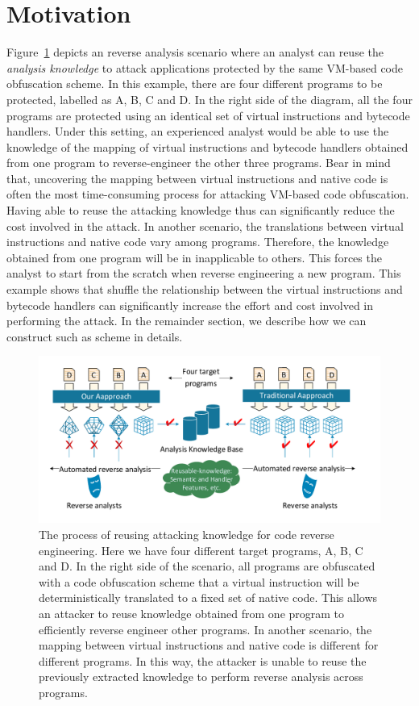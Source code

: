 \section{Motivation}
\label{sec:motivation}


Figure~\ref{fig:motivation} depicts an reverse analysis scenario where an analyst can
reuse the \textit{analysis knowledge} to attack applications protected by
the same VM-based code obfuscation scheme. In this example, there are four different programs
to be protected, labelled as A, B, C and D. In the right side of the diagram,
all the four programs are protected using an identical set of virtual
instructions and bytecode handlers. Under this setting, an experienced analyst would be able to
use the knowledge of the mapping of virtual instructions and bytecode handlers obtained
from one program to reverse-engineer the other three programs. Bear in mind that,
uncovering the mapping between virtual instructions and native code is often the most
time-consuming process for attacking VM-based code obfuscation. Having able to
reuse the attacking knowledge thus can significantly reduce the cost involved in the
attack.
In another scenario, the translations between virtual instructions and native code
vary among programs. Therefore, the knowledge obtained from one program will be in inapplicable to others.
This forces the analyst to start from the scratch when reverse engineering a new program.
This example shows that shuffle the relationship between the virtual instructions and bytecode handlers
can significantly increase the effort and cost involved in performing the attack.
In the remainder section, we describe how we can construct such as scheme in details.


\begin{figure}[!t]
\centering
\includegraphics[width=0.75\columnwidth]{fig/figmotivation.pdf}
\caption{The process of reusing attacking knowledge for code reverse engineering.
Here we have four different target programs, A, B, C and D.
In the right side of the scenario, all programs are obfuscated with a code obfuscation scheme that a virtual instruction will be deterministically translated to a fixed set of native code.
This allows an attacker to reuse knowledge obtained from one program to efficiently reverse engineer other programs.
In another scenario, the mapping between virtual instructions and native code is different for different programs.
In this way, the attacker is  unable to reuse the previously extracted knowledge to perform reverse analysis across programs.}
\label{fig:motivation}
\end{figure}
